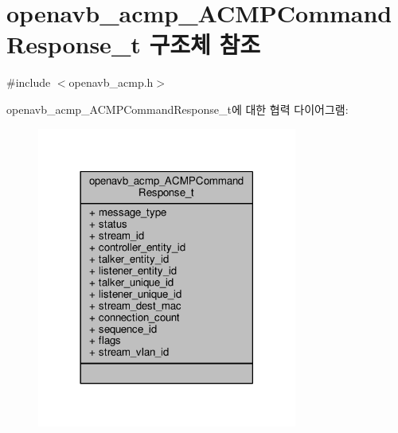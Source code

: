 \hypertarget{structopenavb__acmp___a_c_m_p_command_response__t}{}\section{openavb\+\_\+acmp\+\_\+\+A\+C\+M\+P\+Command\+Response\+\_\+t 구조체 참조}
\label{structopenavb__acmp___a_c_m_p_command_response__t}


{\ttfamily \#include $<$openavb\+\_\+acmp.\+h$>$}



openavb\+\_\+acmp\+\_\+\+A\+C\+M\+P\+Command\+Response\+\_\+t에 대한 협력 다이어그램\+:
\nopagebreak
\begin{figure}[H]
\begin{center}
\leavevmode
\includegraphics[width=242pt]{structopenavb__acmp___a_c_m_p_command_response__t__coll__graph}
\end{center}
\end{figure}
